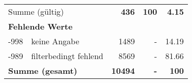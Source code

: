 \begin{longtable}{lXrrr}
     \midrule
     \multicolumn{2}{l}{Summe (gültig)} &
       \textbf{\num{436}} &
     \textbf{\num{100}} &
       \textbf{\num[round-mode=places,round-precision=2]{4.15}} \\
     \multicolumn{5}{l}{\textbf{Fehlende Werte}}\\
       -998 &
       keine Angabe &
         \num{1489} &
        - &
         \num[round-mode=places,round-precision=2]{14.19} \\
       -989 &
       filterbedingt fehlend &
         \num{8569} &
        - &
         \num[round-mode=places,round-precision=2]{81.66} \\
     \midrule
     \multicolumn{2}{l}{\textbf{Summe (gesamt)}} &
          \textbf{\num{10494}} &
        \textbf{-} &
        \textbf{\num{100}} \\
     \bottomrule
     \end{longtable}
     
